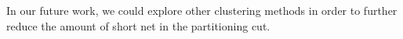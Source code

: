 \documentclass[conference]{IEEEtran}
\begin{document}
In our future work, we could explore other clustering methods in order to further reduce the amount of short net in the partitioning cut.















%



\end{document}
